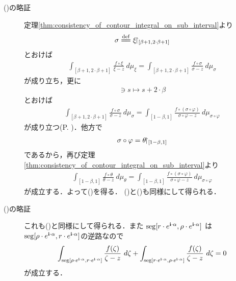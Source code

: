 \begin{description}
		\item[()の略証]	
			定理\ref{thm:consistency_of_contour_integral_on_sub_interval}より
			\begin{align}
				\sigma \defeq \xi \rest_{[\beta+1,2\cdot\beta+1]}
			\end{align}
			とおけば
			\begin{align}
				\int_{[\beta+1,2\cdot\beta+1]} \frac{f \circ \xi}{\xi - z}\ d\mu_{\xi}
				= \int_{[\beta+1,2\cdot\beta+1]} \frac{f \circ \sigma}{\sigma - z}\ d\mu_{\sigma}
			\end{align}
			が成り立ち，更に
			\begin{align}
				[0,1] \ni s \longmapsto s + 2 \cdot \beta
			\end{align}
			とおけば
			\begin{align}
				\int_{[\beta+1,2\cdot\beta+1]} \frac{f \circ \sigma}{\sigma - z}\ d\mu_{\sigma}
				= \int_{[1-\beta,1]} \frac{f \circ (\sigma \circ \varphi)}{\sigma \circ \varphi - z}\ d\mu_{\sigma \circ \varphi}
			\end{align}
			が成り立つ(P. \pageref{fom:change_of_parameter_interval_complex_contour_integral})．他方で
			\begin{align}
				\sigma \circ \varphi = \theta \hspace{-0.41em}\upharpoonright_{[1-\beta,1]}
			\end{align}
			であるから，再び定理\ref{thm:consistency_of_contour_integral_on_sub_interval}より
			\begin{align}
				\int_{[1-\beta,1]} \frac{f \circ \theta}{\theta - z}\ d\mu_{\theta}
				= \int_{[1-\beta,1]} \frac{f \circ (\sigma \circ \varphi)}{\sigma \circ \varphi - z}\ d\mu_{\sigma \circ \varphi}
			\end{align}
			が成立する．よって()を得る．
			()と()も同様にして得られる．
			
		\item[()の略証]
			これも()と同様にして得られる．また
			$\operatorname{seg}[r \cdot e^{\mathbf{i} \cdot \alpha},\rho \cdot e^{\mathbf{i} \cdot \alpha}]$
			は$\operatorname{seg}[\rho \cdot e^{\mathbf{i} \cdot \alpha},r \cdot e^{\mathbf{i} \cdot \alpha}]$の逆路なので
			\begin{align}
				\int_{\operatorname{seg}[\rho \cdot e^{\mathbf{i} \cdot \alpha},r \cdot e^{\mathbf{i} \cdot \alpha}]} \frac{f(\zeta)}{\zeta - z}\ d\zeta
				+ \int_{\operatorname{seg}[r \cdot e^{\mathbf{i} \cdot \alpha},\rho \cdot e^{\mathbf{i} \cdot \alpha}]} \frac{f(\zeta)}{\zeta - z}\ d\zeta 
				= 0
			\end{align}
			が成立する．
	\end{description}